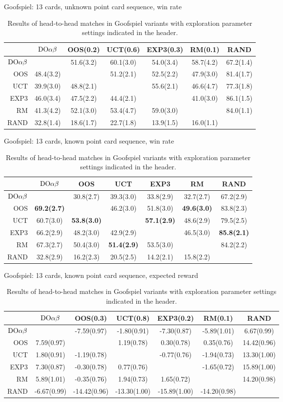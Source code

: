 \begin{table}
\centering
\begin{scriptsize}

Goofspiel: 13 cards, unknown point card sequence, win rate
\begin{tabular}{|r|cccccc|}\hline
&$\textrm{DO}\alpha\beta$&OOS(0.2)&UCT(0.6)&EXP3(0.3)&RM(0.1)&RAND\\\hline
$\textrm{DO}\alpha\beta$&&51.6(3.2)&60.1(3.0)&54.0(3.4)&58.7(4.2)&67.2(1.4)\\
OOS&48.4(3.2)&&51.2(2.1)&52.5(2.2)&47.9(3.0)&81.4(1.7)\\
UCT&39.9(3.0)&48.8(2.1)&&55.6(2.1)&46.6(4.7)&77.3(1.8)\\
EXP3&46.0(3.4)&47.5(2.2)&44.4(2.1)&&41.0(3.0)&86.1(1.5)\\
RM&41.3(4.2)&52.1(3.0)&53.4(4.7)&59.0(3.0)&&84.0(1.1)\\
RAND&32.8(1.4)&18.6(1.7)&22.7(1.8)&13.9(1.5)&16.0(1.1)&\\
\hline
\end{tabular}

Goofspiel: 13 cards, known point card sequence, win rate
\begin{tabular}{|r|cccccc|}\hline
&$\textrm{DO}\alpha\beta$&OOS&UCT&EXP3&RM&RAND\\\hline
$\textrm{DO}\alpha\beta$&&30.8(2.7)&39.3(3.0)&33.8(2.9)&32.7(2.7)&67.2(2.9)\\
OOS&\textbf{69.2(2.7)}&&46.2(3.0)&51.8(3.0)&\textbf{49.6(3.0)}&83.8(2.3)\\
UCT&60.7(3.0)&\textbf{53.8(3.0)}&&\textbf{57.1(2.9)}&48.6(2.9)&79.5(2.5)\\
EXP3&66.2(2.9)&48.2(3.0)&42.9(2.9)&&46.5(3.0)&\textbf{85.8(2.1)}\\
RM&67.3(2.7)&50.4(3.0)&\textbf{51.4(2.9)}&53.5(3.0)&&84.2(2.2)\\
RAND&32.8(2.9)&16.2(2.3)&20.5(2.5)&14.2(2.1)&15.8(2.2)&\\
\hline
\end{tabular}

Goofspiel: 13 cards, known point card sequence, expected reward
\begin{tabular}{|r|cccccc|}\hline
&$\textrm{DO}\alpha\beta$&OOS(0.3)&UCT(0.8)&EXP3(0.2)&RM(0.1)&RAND\\\hline
$\textrm{DO}\alpha\beta$&&-7.59(0.97)&-1.80(0.91)&-7.30(0.87)&-5.89(1.01)&6.67(0.99)\\
OOS&7.59(0.97)&&1.19(0.78)&0.30(0.78)&0.35(0.76)&14.42(0.96)\\
UCT&1.80(0.91)&-1.19(0.78)&&-0.77(0.76)&-1.94(0.73)&13.30(1.00)\\
EXP3&7.30(0.87)&-0.30(0.78)&0.77(0.76)&&-1.65(0.72)&15.89(1.00)\\
RM&5.89(1.01)&-0.35(0.76)&1.94(0.73)&1.65(0.72)&&14.20(0.98)\\
RAND&-6.67(0.99)&-14.42(0.96)&-13.30(1.00)&-15.89(1.00)&-14.20(0.98)&\\
\hline
\end{tabular}
\end{scriptsize}
\caption{Results of head-to-head matches in Goofspiel variants with exploration parameter settings indicated in the header.}\label{fig:matches:goof}
\end{table}

